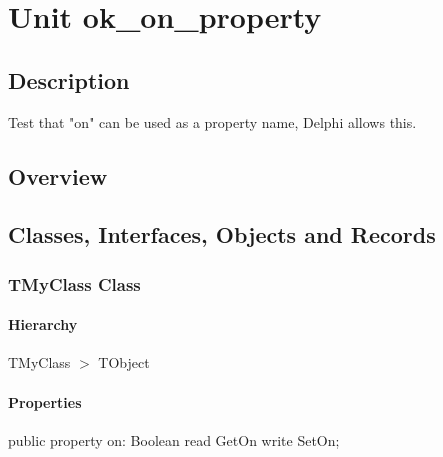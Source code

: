 \documentclass{report}
\newif\ifpdf
\begin{document}
\label{toc}\tableofcontents
\newpage
\newlength{\tmplength}
\chapter{Unit ok{\_}on{\_}property}
\label{ok_on_property}
\section{Description}
Test that "on" can be used as a property name, Delphi allows this.
\section{Overview}
\begin{description}
\item[\texttt{\begin{ttfamily}TMyClass\end{ttfamily} Class}]
\end{description}
\section{Classes, Interfaces, Objects and Records}
\ifpdf
\subsection*{\large{\textbf{TMyClass Class}}\normalsize\hspace{1ex}\hrulefill}
\else
\subsection*{TMyClass Class}
\fi
\label{ok_on_property.TMyClass}
\subsubsection*{\large{\textbf{Hierarchy}}\normalsize\hspace{1ex}\hfill}
TMyClass {$>$} TObject
\subsubsection*{\large{\textbf{Properties}}\normalsize\hspace{1ex}\hfill}
\begin{list}{}{
\setlength{\itemindent}{0cm}
\setlength{\listparindent}{0cm}
\setlength{\leftmargin}{\evensidemargin}
\addtolength{\leftmargin}{\tmplength}
\settowidth{\labelsep}{X}
\addtolength{\leftmargin}{\labelsep}
\setlength{\labelwidth}{\tmplength}
}
\label{ok_on_property.TMyClass-on}
\item[\textbf{on}\hfill]
\ifpdf
\begin{flushleft}
\fi
\begin{ttfamily}
public property on: Boolean read GetOn write SetOn;\end{ttfamily}

\ifpdf
\end{flushleft}
\fi


\par  \end{list}
\end{document}
